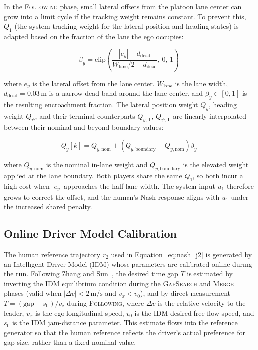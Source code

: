 \documentclass[12pt,a4paper,oneside]{report}
\begin{document}
In the \textsc{Following} phase, small lateral offsets from the platoon lane center can grow into a limit cycle if the tracking weight remains constant. To prevent this, $Q_1$ (the system tracking weight for the lateral position and heading states) is adapted based on the fraction of the lane the ego occupies:

\begin{equation}
\beta_y = \mathrm{clip}\!\left(\frac{|e_y| - d_{\mathrm{dead}}}{W_{\mathrm{lane}}/2 - d_{\mathrm{dead}}},\, 0,\, 1\right)
\label{eq:beyond_frac}
\end{equation}

where $e_y$ is the lateral offset from the lane center, $W_{\mathrm{lane}}$ is the lane width, $d_{\mathrm{dead}} = 0.03\,\mathrm{m}$ is a narrow dead-band around the lane center, and $\beta_y \in [0,1]$ is the resulting encroachment fraction. The lateral position weight $Q_y$, heading weight $Q_\psi$, and their terminal counterparts $Q_{y,\mathrm{T}}$, $Q_{\psi,\mathrm{T}}$ are linearly interpolated between their nominal and beyond-boundary values:

\begin{equation}
Q_y[k] = Q_{y,\mathrm{nom}} + \left(Q_{y,\mathrm{boundary}} - Q_{y,\mathrm{nom}}\right) \beta_y
\label{eq:qy_adapt}
\end{equation}

where $Q_{y,\mathrm{nom}}$ is the nominal in-lane weight and $Q_{y,\mathrm{boundary}}$ is the elevated weight applied at the lane boundary. Both players share the same $Q_1$, so both incur a high cost when $|e_y|$ approaches the half-lane width. The system input $u_1$ therefore grows to correct the offset, and the human's Nash response aligns with $u_1$ under the increased shared penalty.

\subsection{Online Driver Model Calibration}
\label{sec:nash_driver_calib}

The human reference trajectory $r_2$ used in Equation~\ref{eq:nash_j2} is generated by an Intelligent Driver Model (IDM) whose parameters are calibrated online during the run. Following Zhang and Sun~\cite{zhangBayesianCalibrationIntelligent2024}, the desired time gap $T$ is estimated by inverting the IDM equilibrium condition during the \textsc{GapSearch} and \textsc{Merge} phases (valid when $|\Delta v| < 2\,\mathrm{m/s}$ and $v_x < v_0$), and by direct measurement $T = (\mathrm{gap} - s_0)/v_x$ during \textsc{Following}, where $\Delta v$ is the relative velocity to the leader, $v_x$ is the ego longitudinal speed, $v_0$ is the IDM desired free-flow speed, and $s_0$ is the IDM jam-distance parameter. This estimate flows into the reference generator so that the human reference reflects the driver's actual preference for gap size, rather than a fixed nominal value.
\end{document}
